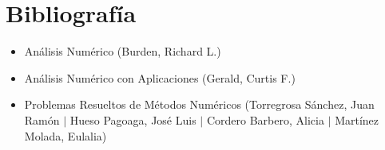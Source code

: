 \documentclass[a4paper]{article}
\begin{document}
\section{Bibliografía}
\begin{itemize}
    \item Análisis Numérico (Burden, Richard L.)
    \item Análisis Numérico con Aplicaciones (Gerald, Curtis F.)
    \item Problemas Resueltos de Métodos Numéricos (Torregrosa Sánchez, Juan Ramón $\vert$ Hueso Pagoaga, José Luis $\vert$ Cordero Barbero, Alicia $\vert$ Martínez Molada, Eulalia)
\end{itemize}
\end{document}
